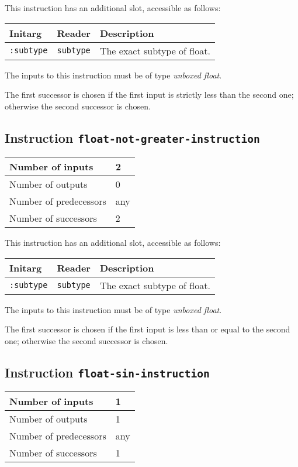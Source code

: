 This instruction has an additional slot, accessible as follows:

\begin{tabular}{|l|l|l|}
  \hline
  Initarg & Reader & Description\\
  \hline\hline
  \texttt{:subtype} & \texttt{subtype} & The exact subtype of float.\\
  \hline
\end{tabular}

The inputs to this instruction must be of type \emph{unboxed
  float}.

The first successor is chosen if the first input is strictly less than
the second one; otherwise the second successor is chosen. 

\subsection{Instruction \texttt{float-not-greater-instruction}}
\label{hir-instruction-float-not-greater}

\begin{tabular}{|l|l|}
\hline
Number of inputs & 2\\
\hline
Number of outputs & 0\\
\hline
Number of predecessors & any\\
\hline
Number of successors & 2\\
\hline
\end{tabular}

This instruction has an additional slot, accessible as follows:

\begin{tabular}{|l|l|l|}
  \hline
  Initarg & Reader & Description\\
  \hline\hline
  \texttt{:subtype} & \texttt{subtype} & The exact subtype of float.\\
  \hline
\end{tabular}

The inputs to this instruction must be of type \emph{unboxed
  float}.

The first successor is chosen if the first input is less than or equal
to the second one; otherwise the second successor is chosen.

\subsection{Instruction \texttt{float-sin-instruction}}
\label{hir-instruction-float-div}

\begin{tabular}{|l|l|}
\hline
Number of inputs & 1\\
\hline
Number of outputs & 1\\
\hline
Number of predecessors & any\\
\hline
Number of successors & 1\\
\hline
\end{tabular}

